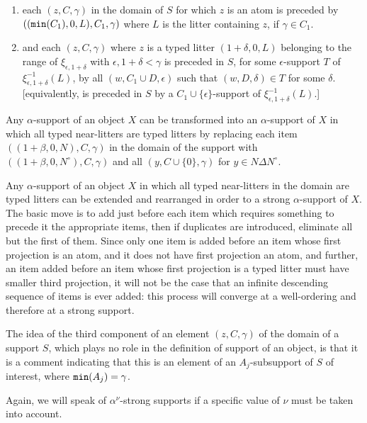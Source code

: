 \documentclass[12pt]{article}
\begin{document}
\begin{enumerate}

\item each $(z,C,\gamma)$ in the domain of $S$ for which $z$ is
an atom is preceded by $(({\tt min}(C_1),0,L),C_1,\gamma)$ where $L$ is the litter containing $z$,  if $\gamma \in C_1$.

\item and each $(z,C,\gamma)$ where $z$ is a typed litter $(1+\delta,0,L)$ belonging to the range of $\xi_{\epsilon,1+\delta}$
with $\epsilon, 1+\delta<\gamma$ is preceded in $S$, for some $\epsilon$-support $T$ of $\xi_{\epsilon,1+\delta}^{-1}(L)$, by all $(w,C_1 \cup D,\epsilon)$ such that $(w,D,\delta) \in T$ for some $\delta$.  [equivalently, is preceded in $S$ by a $C_1 \cup \{\epsilon\}$-support of $\xi_{\epsilon,1+\delta}^{-1}(L)$.]

\end{enumerate}

Any $\alpha$-support of an object $X$ can be transformed into an $\alpha$-support of $X$ in which all typed near-litters are typed litters by replacing each item $((1+\beta,0,N),C,\gamma)$ in the domain of the support with
$((1+\beta,0,N^\circ),C,\gamma)$ and all $(y,C \cup \{0\},\gamma)$ for $y \in N \Delta N^\circ$.

Any $\alpha$-support of an object $X$ in which all typed near-litters in the domain are typed litters can be extended and rearranged in order to a strong $\alpha$-support of $X$.  The basic move is to add just before each item which requires something to precede it the appropriate items, then if duplicates are introduced, eliminate all but the first of them.   Since only one item is added before an item whose first projection is an atom, and it does not have first projection an atom, and further, an item added before an item whose first projection is a typed litter must have smaller third projection, it will not be the case that an infinite descending sequence of items is ever added:  this process will converge at a well-ordering and therefore at a strong support.

The idea of the third component of an element $(z,C,\gamma)$ of the domain of a support $S$, which plays no role
in the definition of support of an object, is that it is a comment indicating that this is an element of an $A_j$-subsupport of $S$ of interest, where ${\tt min}(A_j)=\gamma$.

Again, we will speak of $\alpha^\nu$-strong supports if a specific value of $\nu$ must be taken into account.
\end{document}
